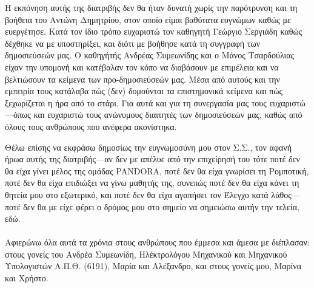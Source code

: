 \cleardoublepage

Η εκπόνηση αυτής της διατριβής δεν θα ήταν δυνατή χωρίς την παρότρυνση και τη
βοήθεια του Αντώνη Δημητρίου, στον οποίο είμαι βαθύτατα ευγνώμων καθώς με
ευεργέτησε. Κατά τον ίδιο τρόπο ευχαριστώ τον καθηγητή Γεώργιο Σεργιάδη καθώς
δέχθηκε να με υποστηρίξει, και διότι με βοήθησε κατά τη συγγραφή των
δημοσιεύσεών μας. Ο καθηγήτής Ανδρέας Συμεωνίδης και ο Μάνος Τσαρδούλιας είχαν
την υπομονή και κατέβαλαν τον κόπο να διαβάσουν με επιμέλεια και να βελτιώσουν
τα κείμενα των προ-δημοσιεύσεών μας. Μέσα από αυτούς και την εμπειρία τους
κατάλαβα πώς (δεν) δομούνται τα επιστημονικά κείμενα και πώς ξεχωρίζεται η ήρα
από το στάρι. Για αυτά και για τη συνεργασία μας τους ευχαριστώ---όπως και
ευχαριστώ τους ανώνυμους διαιτητές των δημοσιεύσεών μας, καθώς από όλους τους
ανθρώπους που ανέφερα ακονίστηκα.

Θέλω επίσης να εκφράσω δημοσίως την ευγνωμοσύνη μου στον Σ.Σ., τον αφανή ήρωα
αυτής της διατριβής---αν δεν με απέλυε από την επιχείρησή του τότε ποτέ δεν θα
είχα γίνει μέλος της ομάδας PANDORA, ποτέ δεν θα είχα γνωρίσει τη Ρομποτική,
ποτέ δεν θα είχα επιδιώξει να γίνω μαθητής της, συνεπώς ποτέ δεν θα είχα κάνει
τη θητεία μου στο εξωτερικό, και ποτέ δεν θα είχα αγαπήσει τον Έλεγχο κατά
λάθος---ποτέ δεν θα με είχε φέρει ο δρόμος μου στο σημείο να σημειώσω αυτήν την
τελεία, εδώ.  \\ \\

Αφιερώνω όλα αυτά τα χρόνια στους ανθρώπους που έμμεσα και άμεσα με διέπλασαν:
στους γονείς του Ανδρέα Συμεωνίδη, Ηλέκτρολόγου Μηχανικού και Μηχανικού
Υπολογιστών Α.Π.Θ. (6191), Μαρία και Αλέξανδρο, και στους γονείς μου, Μαρίνα και
Χρήστο.

\restoregeometry
\cleardoublepage
